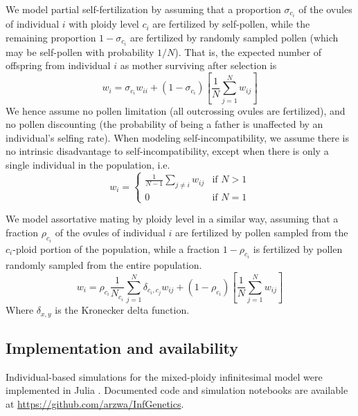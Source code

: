 \documentclass[12pt,a4paper]{article}
\begin{document}
    We model partial self-fertilization by assuming that a proportion
    $\sigma_{c_i}$ of the ovules of individual $i$ with ploidy level $c_i$ are
    fertilized by self-pollen, while the remaining proportion $1-\sigma_{c_i}$ are
    fertilized by randomly sampled pollen (which may be self-pollen with
    probability $1/N$). 
    That is, the expected number of offspring from individual $i$ as mother
    surviving after selection is
    \begin{equation}
    w_i = \sigma_{c_i} w_{ii} +
      (1-\sigma_{c_i})\left[\frac{1}{N}\sum_{j=1}^N w_{ij}\right]
    \end{equation}
    We hence assume no pollen limitation (all outcrossing ovules are fertilized),
    and no pollen discounting (the probability of being a father is unaffected by
    an individual's selfing rate).
    When modeling self-incompatibility, we assume there is no intrinsic
    disadvantage to self-incompatibility, except when there is only a single
    individual in the population, i.e.
    \begin{equation}
    w_i = \begin{cases}
        \frac{1}{N-1}\sum_{j \ne i }w_{ij} & \text{if } N > 1\\ 
        0 & \text{if } N=1 \end{cases}
    \end{equation}

    We model assortative mating by ploidy level in a similar way, assuming that a
    fraction $\rho_{c_i}$ of the ovules of individual $i$ are fertilized by pollen
    sampled from the $c_i$-ploid portion of the population, while a fraction
    $1-\rho_{c_i}$ is fertilized by pollen randomly sampled from the entire
    population.
    \begin{equation}
    w_i = \rho_{c_i} \frac{1}{N_{c_{i}}} \sum_{j=1}^N \delta_{c_i,c_j}w_{ij}
     + (1-\rho_{c_i})
    \left[\frac{1}{N}\sum_{j=1}^N w_{ij}\right]
    \end{equation}
    Where $\delta_{x,y}$ is the Kronecker delta function.

    \subsection*{Implementation and availability}

    Individual-based simulations for the mixed-ploidy infinitesimal model were
    implemented in Julia \citep{julia}.
    Documented code and simulation notebooks are available at \url{https://github.com/arzwa/InfGenetics}.
\end{document}
